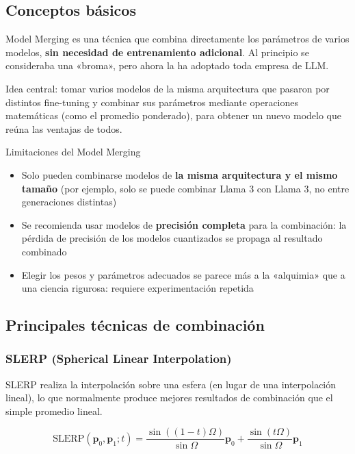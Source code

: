 \documentclass[a4paper]{article}
\begin{document}
\subsection{Conceptos básicos}

Model Merging es una técnica que combina directamente los parámetros de varios modelos, \textbf{sin necesidad de entrenamiento adicional}. Al principio se consideraba una «broma», pero ahora la ha adoptado toda empresa de LLM.

Idea central: tomar varios modelos de la misma arquitectura que pasaron por distintos fine-tuning y combinar sus parámetros mediante operaciones matemáticas (como el promedio ponderado), para obtener un nuevo modelo que reúna las ventajas de todos.

\begin{warningbox}{Limitaciones del Model Merging}
\begin{itemize}
    \item Solo pueden combinarse modelos de \textbf{la misma arquitectura y el mismo tamaño} (por ejemplo, solo se puede combinar Llama 3 con Llama 3, no entre generaciones distintas)
    \item Se recomienda usar modelos de \textbf{precisión completa} para la combinación: la pérdida de precisión de los modelos cuantizados se propaga al resultado combinado
    \item Elegir los pesos y parámetros adecuados se parece más a la «alquimia» que a una ciencia rigurosa: requiere experimentación repetida
\end{itemize}
\end{warningbox}

\subsection{Principales técnicas de combinación}

\subsubsection{SLERP (Spherical Linear Interpolation)}

SLERP realiza la interpolación sobre una esfera (en lugar de una interpolación lineal), lo que normalmente produce mejores resultados de combinación que el simple promedio lineal.

$$\text{SLERP}(\mathbf{p}_0, \mathbf{p}_1; t) = \frac{\sin((1-t)\Omega)}{\sin\Omega}\mathbf{p}_0 + \frac{\sin(t\Omega)}{\sin\Omega}\mathbf{p}_1$$
\end{document}
